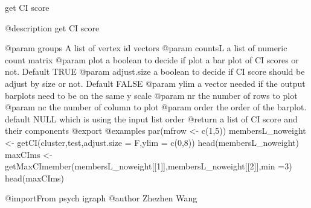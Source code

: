 \documentclass[]{article}
\begin{document}
get CI score

@description get CI score

@param groups A list of vertex id vectors @param countsL a list of
numeric count matrix @param plot a boolean to decide if plot a bar plot
of CI scores or not. Default TRUE @param adjust.size a boolean to decide
if CI score should be adjust by size or not. Default FALSE @param ylim a
vector needed if the output barplots need to be on the same y scale
@param nr the number of rows to plot @param nc the number of column to
plot @param order the order of the barplot. default NULL which is using
the input list order @return a list of CI score and their components
@export @examples par(mfrow \textless- c(1,5)) membersL\_noweight
\textless- getCI(cluster,test,adjust.size = F,ylim = c(0,8))
head(membersL\_noweight) maxCIms \textless-
getMaxCImember(membersL\_noweight{[}{[}1{]}{]},membersL\_noweight{[}{[}2{]}{]},min
=3) head(maxCIms)

@importFrom psych igraph @author Zhezhen Wang
\end{document}
